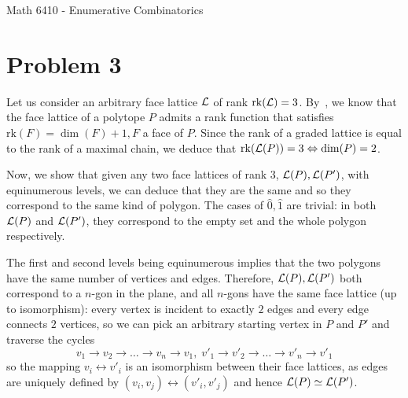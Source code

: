 \documentclass[11pt]{article}
\begin{document}
\allowdisplaybreaks

%
{Math 6410 - Enumerative Combinatorics}

\section*{Problem 3}
Let us consider an arbitrary face lattice $\mathcal{L}$ of rank $\mathrm{rk}(\mathcal{L}) = 3$.
By~\cite[Theorem 2.7]{Zieg95}, we know that the face lattice of a polytope $P$
admits a rank function that satisfies $\mathrm{rk}(F) = \dim(F) + 1, F$ a face
of $P$. Since the rank of a graded lattice is equal to the rank of a maximal
chain, we deduce that $\mathrm{rk}(\mathcal{L}(P)) = 3 \Leftrightarrow \dim(P) = 2$.

Now, we show that given any two face lattices of rank $3$, $\mathcal{L}(P), \mathcal{L}(P')$, 
with equinumerous levels, we can deduce that they are the same and so they
correspond to the same kind of polygon. The cases of $\hat{0}, \hat{1}$ are 
trivial: in both $\mathcal{L}(P)$ and $\mathcal{L}(P')$, they correspond to the empty set and 
the whole polygon respectively.

The first and second levels being equinumerous implies that the two polygons 
have the same number of vertices and edges.  Therefore, $\mathcal{L}(P), \mathcal{L}(P')$ both 
correspond to a $n$-gon in the plane, and all $n$-gons have the same face 
lattice (up to isomorphism): every vertex is incident to exactly $2$ edges and
every edge connects $2$ vertices, so we can pick an arbitrary starting vertex 
in $P$ and $P'$ and traverse the cycles 
\[
    v_1 \to v_2 \to \dots \to v_n \to v_1, \;
    v'_1 \to v'_2 \to \dots \to v'_n \to v'_1
\]
so the mapping $v_i \leftrightarrow v'_i$ is an isomorphism between their face
lattices, as edges are uniquely defined by $(v_i, v_j) \leftrightarrow (v'_i, 
v'_j)$ and hence $\mathcal{L}(P) \simeq \mathcal{L}(P')$.


\end{document}
